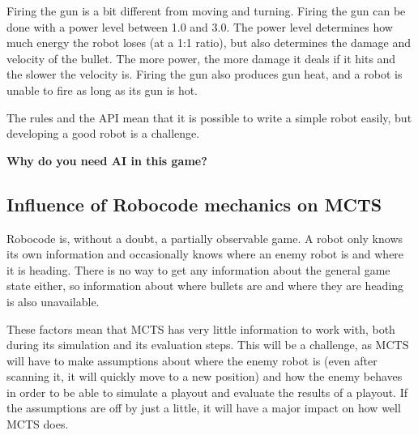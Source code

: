 Firing the gun is a bit different from moving and turning. Firing the gun can be done with a power level between 1.0 and 3.0. The power level determines how much energy the robot loses (at a 1:1 ratio), but also determines the damage and velocity of the bullet. The more power, the more damage it deals if it hits and the slower the velocity is. Firing the gun also produces gun heat, and a robot is unable to fire as long as its gun is hot.

The rules and the API mean that it is possible to write a simple robot easily, but developing a good robot is a challenge.


\textbf{Why do you need AI in this game?}


\subsection{Influence of Robocode mechanics on MCTS}
\label{03_01}

Robocode is, without a doubt, a partially observable game. A robot only knows its own information and occasionally knows where an enemy robot is and where it is heading. There is no way to get any information about the general game state either, so information about where bullets are and where they are heading is also unavailable.

These factors mean that MCTS has very little information to work with, both during its simulation and its evaluation steps. This will be a challenge, as MCTS will have to make assumptions about where the enemy robot is (even after scanning it, it will quickly move to a new position) and how the enemy behaves in order to be able to simulate a playout and evaluate the results of a playout. If the assumptions are off by just a little, it will have a major impact on how well MCTS does.

